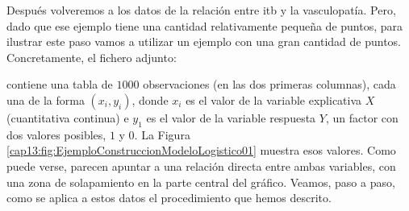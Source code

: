 \begin{ejemplo}
\label{cap13:ejem:EstimacionModeloLogisticoMedianteClases}
Después volveremos a los datos de la relación entre itb y la vasculopatía. Pero, dado que ese ejemplo tiene una cantidad relativamente pequeña de puntos, para ilustrar este paso vamos a utilizar un ejemplo con una gran cantidad de puntos. Concretamente, el fichero adjunto:
\begin{center}
\end{center}
contiene una tabla de $1000$ observaciones (en las dos primeras columnas), cada una de la forma $(x_i,y_i)$, donde $x_i$ es el valor de la variable explicativa $X$ (cuantitativa continua) e $y_1$ es el valor de la variable respuesta $Y$, un factor con dos valores posibles, $1$ y $0$. La Figura \ref{cap13:fig:EjemploConstruccionModeloLogistico01} muestra esos valores. Como puede verse, parecen apuntar a una relación directa entre ambas variables, con una zona de solapamiento en la parte central del gráfico. Veamos, paso a paso, como se aplica a estos datos el procedimiento que hemos descrito.


\end{ejemplo}
